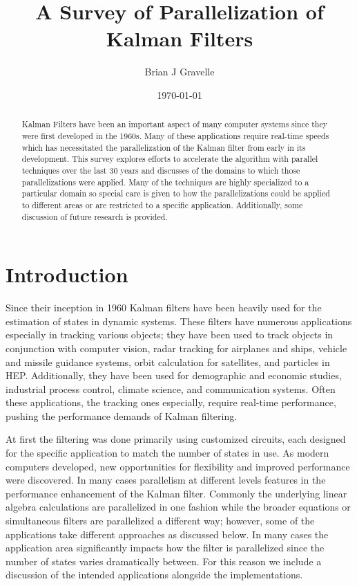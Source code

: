 \documentclass[11pt]{article}
\title{A Survey of Parallelization of Kalman Filters}
\author{
       Brian J Gravelle 
}
\date{\today}
\begin{document}
\maketitle

\begin{abstract}
Kalman Filters have been an important aspect of many computer systems since they were first developed in the 1960s. Many of these applications require real-time speeds which has necessitated the parallelization of the Kalman filter from early in its development. This survey explores efforts to accelerate the algorithm with parallel techniques over the last 30 years  and discusses of the domains to which those parallelizations were applied. Many of the techniques are highly specialized to a particular domain so special care is given to how the parallelizations could be applied to different areas or are restricted to a specific application. Additionally, some discussion of future research is provided.
\end{abstract}

\section{Introduction}
Since their inception in 1960 Kalman filters have been heavily used for the estimation of states in dynamic systems. These filters have numerous applications especially in tracking various objects; they have been used to track objects in conjunction with computer vision, radar tracking for airplanes and ships, vehicle and missile guidance systems, orbit calculation for satellites, and particles in HEP. Additionally, they have been used for demographic and economic studies, industrial process control, climate science, and communication systems. Often these applications, the tracking ones especially, require real-time performance, pushing the performance demands of Kalman filtering.

At first the filtering was done primarily using customized circuits, each designed for the specific application to match the number of states in use. As modern computers developed, new opportunities for flexibility and improved performance were discovered. In many cases parallelism at different levels features in the performance enhancement of the Kalman filter. Commonly the underlying linear algebra calculations are parallelized in one fashion while the broader equations or simultaneous filters are parallelized a different way; however, some of the applications take different approaches as discussed below. In many cases the application area significantly impacts how the filter is parallelized since the number of states varies dramatically between. For this reason we include a discussion of the intended applications alongside the implementations.
\end{document}
